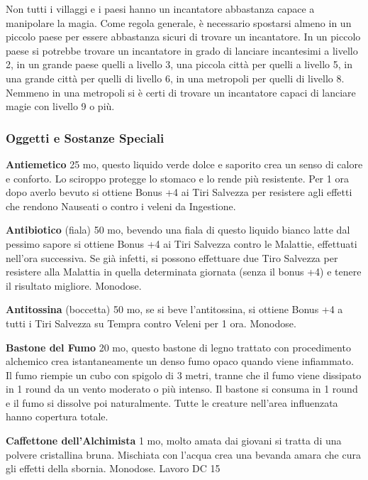 \begin{multicols}{2}
Non tutti i villaggi e i paesi hanno un incantatore abbastanza capace a manipolare la magia. Come regola generale, è necessario spostarsi almeno in un piccolo paese per essere abbastanza sicuri di trovare un incantatore. In un piccolo paese si potrebbe trovare un incantatore in grado di lanciare incantesimi a livello 2, in un grande paese quelli a livello 3, una piccola città per quelli a livello 5, in una grande città per quelli di livello 6, in una metropoli per quelli di livello 8. Nemmeno in una metropoli si è certi di trovare un incantatore capaci di lanciare magie con livello 9 o più.




\subsubsection{Oggetti e Sostanze Speciali}

\textbf{Antiemetico} 25 mo, questo liquido verde dolce e saporito crea un senso di calore e conforto. Lo sciroppo protegge lo stomaco e lo rende più resistente. Per 1 ora dopo averlo bevuto si ottiene Bonus +4 ai Tiri Salvezza per resistere agli effetti che rendono Nauseati o contro i veleni da Ingestione.

\textbf{Antibiotico} (fiala) 50 mo, bevendo una fiala di questo liquido bianco latte dal pessimo sapore si ottiene Bonus +4 ai Tiri Salvezza contro le Malattie, effettuati nell'ora successiva. Se già infetti, si possono effettuare due Tiro Salvezza per resistere alla Malattia in quella determinata giornata (senza il bonus +4) e tenere il risultato migliore. Monodose.

\textbf{Antitossina} (boccetta) 50 mo, se si beve l'antitossina, si ottiene Bonus +4 a tutti i Tiri Salvezza su Tempra contro Veleni per 1 ora. Monodose.

\textbf{Bastone del Fumo} 20 mo, questo bastone di legno trattato con procedimento alchemico crea istantaneamente un denso fumo opaco quando viene infiammato. Il fumo riempie un cubo con spigolo di 3 metri, tranne che il fumo viene dissipato in 1 round da un vento moderato o più intenso. Il bastone si consuma in 1 round e il fumo si dissolve poi naturalmente. Tutte le creature nell'area influenzata hanno copertura totale.

\textbf{Caffettone dell'Alchimista} 1 mo, molto amata dai giovani si tratta di una polvere cristallina bruna. Mischiata con l'acqua crea una bevanda amara che cura gli effetti della sbornia. Monodose. Lavoro DC 15


\end{multicols}

